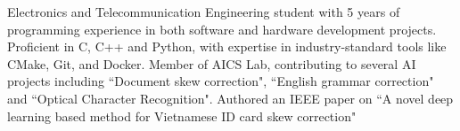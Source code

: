 
\begin{cvparagraph}
  Electronics and Telecommunication Engineering student with 5 years of programming experience in both software and hardware development projects.
  Proficient in C, C++ and Python, with expertise in industry-standard tools like CMake, Git, and Docker.
  Member of AICS Lab, contributing to several AI projects including ``Document skew correction", ``English grammar correction" and ``Optical Character Recognition".
  Authored an IEEE paper on ``A novel deep learning based method for Vietnamese ID card skew correction"


\end{cvparagraph}
